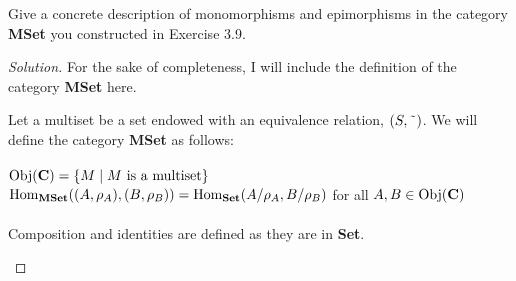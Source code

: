 \documentclass[12pt]{article}
\newenvironment{problem}[2][Problem]{\begin{trivlist}
\item[\hskip \labelsep {\bfseries #1}\hskip \labelsep {\bfseries #2.}]}{\end{trivlist}}
\newenvironment{definition}[1][Definition]{\begin{trivlist}
\item[\hskip \labelsep {\bfseries #1.}]}{\end{trivlist}}
\newcommand{\til}{\char`\~}
\newcommand{\catname}[1]{\normalfont\textbf{#1}}
\newcommand{\Hom}{\text{Hom}}
\newcommand{\Homc}[2]{\Hom_{\catname{#1}}(#2)}
\newcommand{\Obj}[1]{\text{Obj}(\catname{C})}
\newenvironment{solution}
  {\renewcommand\qedsymbol{$\blacksquare$}\begin{proof}[Solution]}
{\end{proof}}
\begin{document}
\begin{problem}{4.5}
Give a concrete description of monomorphisms and epimorphisms in the category \catname{MSet} you constructed in Exercise 3.9.
\end{problem}
\begin{solution}
  For the sake of completeness, I will include the definition of the category \catname{MSet} here.
  \begin{definition}
    Let a multiset be a set endowed with an equivalence relation, $(S,\til)$.
    We will define the category \catname{MSet} as follows:\\\\

    \noindent$\Obj{MSet} = \{M \mid M \text{ is a multiset}\}$\\
    $\Homc{MSet}{(A,\rho_A), (B,\rho_B)} = \Homc{Set}{A/\rho_A, B/\rho_B}$ for all $A,B\in\Obj{MSet}$\\\\
    Composition and identities are defined as they are in \catname{Set}.
  \end{definition}
\end{solution}
\end{document}
